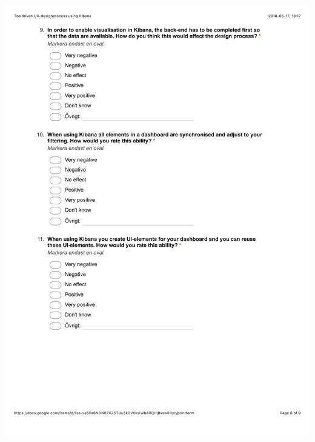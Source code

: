 \documentclass[12pt]{kththesis}
\begin{document}
\begin{appendices}
\includegraphics[width=1\textwidth]{UX_designprocess8.pdf}
\newpage

\end{appendices}
\end{document}
